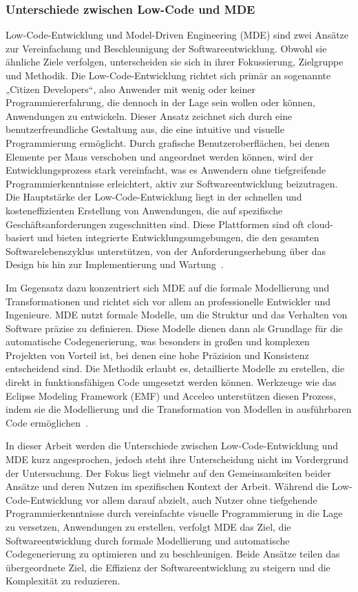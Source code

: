 \subsubsection{Unterschiede zwischen Low-Code und MDE}
Low-Code-Entwicklung und Model-Driven Engineering (MDE) sind zwei Ansätze zur Vereinfachung und Beschleunigung der 
Softwareentwicklung. Obwohl sie ähnliche Ziele verfolgen, unterscheiden sie sich in ihrer Fokussierung, Zielgruppe und Methodik.
Die Low-Code-Entwicklung richtet sich primär an sogenannte „Citizen Developers“, also Anwender mit wenig 
oder keiner Programmiererfahrung, die dennoch in der Lage sein wollen oder können, Anwendungen zu entwickeln. Dieser Ansatz zeichnet 
sich durch eine benutzerfreundliche Gestaltung aus, die eine intuitive und visuelle Programmierung ermöglicht. Durch 
grafische Benutzeroberflächen, bei denen Elemente per Maus verschoben und angeordnet werden können, wird der 
Entwicklungsprozess stark vereinfacht, was es Anwendern ohne tiefgreifende Programmierkenntnisse erleichtert, aktiv 
zur Softwareentwicklung beizutragen. Die Hauptstärke der Low-Code-Entwicklung 
liegt in der schnellen und kosteneffizienten Erstellung von Anwendungen, die auf spezifische Geschäftsanforderungen 
zugeschnitten sind. Diese Plattformen sind oft cloud-basiert und bieten integrierte Entwicklungsumgebungen, die den 
gesamten Softwarelebenszyklus unterstützen, von der Anforderungserhebung über das Design bis hin zur Implementierung 
und Wartung~\cite{Cabot_2020}.

Im Gegensatz dazu konzentriert sich MDE auf die formale Modellierung und Transformationen und 
richtet sich vor allem an professionelle Entwickler und Ingenieure. MDE nutzt formale Modelle, um die Struktur und das 
Verhalten von Software präzise zu definieren. Diese Modelle dienen dann als Grundlage für die automatische Codegenerierung, 
was besonders in großen und komplexen Projekten von Vorteil ist, bei denen eine hohe Präzision und Konsistenz entscheidend 
sind. Die Methodik erlaubt es, detaillierte Modelle zu erstellen, die direkt in funktionsfähigen Code umgesetzt werden 
können. Werkzeuge wie das Eclipse Modeling Framework (EMF) und Acceleo unterstützen diesen Prozess, indem sie die Modellierung 
und die Transformation von Modellen in ausführbaren Code ermöglichen~\cite{di2022low}.

In dieser Arbeit werden die Unterschiede zwischen Low-Code-Entwicklung und MDE kurz angesprochen, 
jedoch steht ihre Unterscheidung nicht im Vordergrund der Untersuchung. Der Fokus liegt vielmehr auf den Gemeinsamkeiten beider 
Ansätze und deren Nutzen im spezifischen Kontext der Arbeit. Während die Low-Code-Entwicklung vor allem darauf abzielt, 
auch Nutzer ohne tiefgehende Programmierkenntnisse durch vereinfachte visuelle Programmierung in die Lage zu versetzen, Anwendungen 
zu erstellen, verfolgt MDE das Ziel, die Softwareentwicklung durch formale Modellierung und automatische Codegenerierung zu optimieren 
und zu beschleunigen. Beide Ansätze teilen das übergeordnete Ziel, die Effizienz der Softwareentwicklung zu steigern und 
die Komplexität zu reduzieren.

